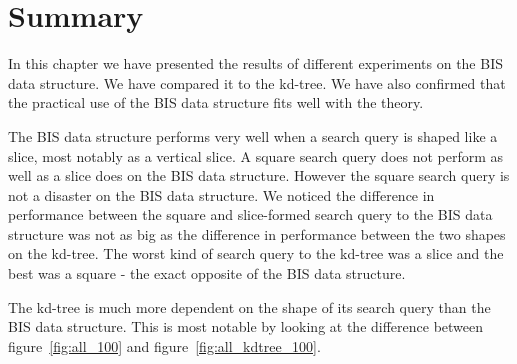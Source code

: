 

\section{Summary}

In this chapter we have presented the results of different experiments on the BIS data structure. We have compared it to the kd-tree. We have also confirmed that the practical use of the BIS data structure fits well with the theory.

The BIS data structure performs very well when a search query is shaped like a slice, most notably as a vertical slice. A square search query does not perform as well as a slice does on the BIS data structure. However the square search query is not a disaster on the BIS data structure. We noticed the difference in performance between the square and slice-formed search query to the BIS data structure was not as big as the difference in performance between the two shapes on the kd-tree. The worst kind of search query to the kd-tree was a slice and the best was a square - the exact opposite of the BIS data structure. 

The kd-tree is much more dependent on the shape of its search query than the BIS data structure. This is most notable by looking at the difference between figure~\ref{fig:all_100} and figure~\ref{fig:all_kdtree_100}.


